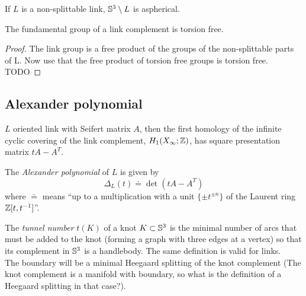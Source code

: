 \begin{proposition}
	If $L$ is a non-splittable link, $\mathbb{S}^{3} \setminus L$
	is aspherical.
\end{proposition}

\begin{corollary}
	The fundamental group of a link complement is torsion free.
\end{corollary}
\begin{proof}
	The link group is a free product of the groups
	of the non-splittable parts of L.
	Now use that the free product of torsion free groups is
	torsion free. 
	TODO 
\end{proof}





\subsection{Alexander polynomial}

\begin{definition}
	$L$ oriented link with Seifert matrix $A$, then the first homology of
	the infinite cyclic covering of the link complement, $H_1(X_{\infty} ; \mathbb{Z})$,
	has square presentation matrix $t A - A^{T}$.
	
	The \textit{Alexander polynomial} of $L$ is given by
	\begin{equation*}
		\Delta_{L}(t) \doteq \det(t A - A^{T})
	\end{equation*}
	where $\doteq$ means ``up to a multiplication with a unit $\{ \pm t^{\pm n} \}$
	of the Laurent ring $\mathbb{Z}[t, t^{-1}]$''.
\end{definition}




\begin{definition}
	The \textit{tunnel number} $t(K)$ of a knot $K \subset \mathbb{S}^{3}$ is the minimal number of arcs
	that must be added to the knot (forming a graph with three edges at a vertex) so that
	its complement in $\mathbb{S}^{3}$ is a handlebody. The same definition is
	valid for links. \\
	The boundary will be a minimal Heegaard splitting of the knot complement
	(The knot complement is a manifold with boundary, so what is the definition
	of a Heegaard splitting in that case?).
\end{definition}

